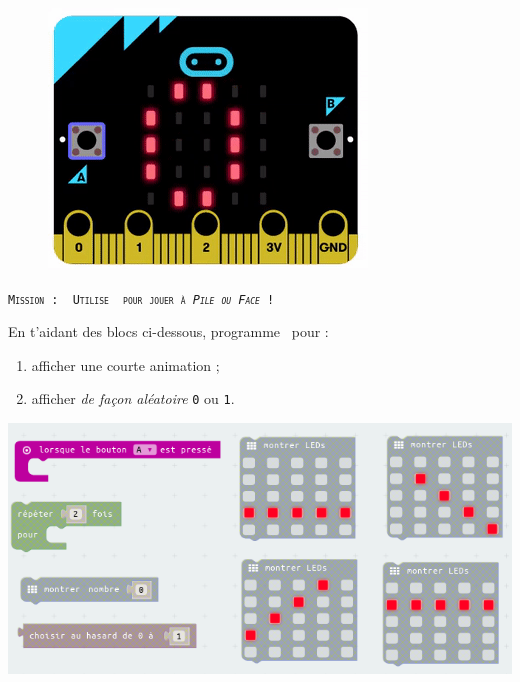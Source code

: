 \begin{figure}
    \includegraphics[width=\linewidth]{res/mbPileFaceN1.png}
\end{figure}
\begin{eleve}
\texttt{\scshape{Mission : }
Utilise \mb~pour jouer à \emph{Pile ou Face} !}

En t'aidant des blocs ci-dessous, programme \mb~pour : 
\begin{enumerate}
    \item afficher une courte animation ;
    \item afficher \emph{de façon aléatoire} \texttt{0} ou \texttt{1}.
\end{enumerate}

\includegraphics[width=\textwidth]{res/mbPileFaceN1blocs}

\end{eleve}


